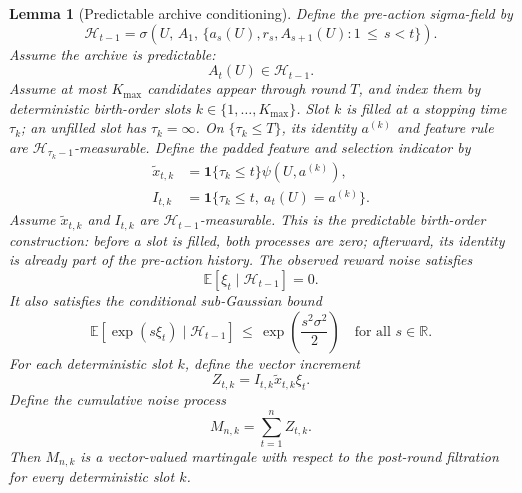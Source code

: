 \documentclass{article} %
\newtheorem{lemma}[theorem]{Lemma}
\begin{document}
\begin{lemma}[Predictable archive conditioning]
\label{lem:3}
Define the pre-action sigma-field by
\begin{equation}
\label{eq:app-filtration-pre}
\mathcal{H}_{t-1}
=
\sigma\!\left(
U,\,
A_1,\,
\{a_s(U),r_s,A_{s+1}(U):1\,\le\, s<t\}
\right).
\end{equation}
Assume the archive is predictable:
\begin{equation}
\label{eq:app-predictable-archive}
A_t(U)\in \mathcal{H}_{t-1}.
\end{equation}
Assume at most \(K_{\max}\) candidates appear through round \(T\), and index
them by deterministic birth-order slots \(k\in\{1,\ldots,K_{\max}\}\).  Slot
\(k\) is filled at a stopping time \(\tau_k\); an unfilled slot has
\(\tau_k=\infty\).  On \(\{\tau_k\le T\}\), its identity \(a^{(k)}\) and feature
rule are \(\mathcal H_{\tau_k-1}\)-measurable.  Define the padded feature and
selection indicator by
\begin{align}
\label{eq:app-feature-definition}
\widetilde x_{t,k}
&=
\mathbf 1\{\tau_k\le t\}\psi(U,a^{(k)}),
\\
\label{eq:app-action-predictable}
I_{t,k}
&=
\mathbf 1\{\tau_k\le t,\ a_t(U)=a^{(k)}\}.
\end{align}
Assume \(\widetilde x_{t,k}\) and \(I_{t,k}\) are
\(\mathcal H_{t-1}\)-measurable.  This is the predictable birth-order
construction: before a slot is filled, both processes are zero; afterward, its
identity is already part of the pre-action history.
The observed reward noise satisfies
\begin{equation}
\label{eq:app-noise-zero-mean}
\mathbb{E}[\xi_t\mid \mathcal{H}_{t-1}]
=
0.
\end{equation}
It also satisfies the conditional sub-Gaussian bound
\begin{equation}
\label{eq:app-noise-subg}
\mathbb{E}\!\left[\exp(s\xi_t)\mid \mathcal{H}_{t-1}\right]
\,\le\,
\exp\!\left(\frac{s^2\sigma^2}{2}\right)
\quad
\text{for all }s\in\mathbb{R}.
\end{equation}
For each deterministic slot \(k\), define the vector increment
\begin{equation}
\label{eq:app-mart-increment}
Z_{t,k}
=
I_{t,k}\widetilde x_{t,k}\xi_t.
\end{equation}
Define the cumulative noise process
\begin{equation}
\label{eq:app-mart-process}
M_{n,k}
=
\sum_{t=1}^{n}Z_{t,k}.
\end{equation}
Then \(M_{n,k}\) is a vector-valued martingale with respect to the post-round
filtration for every deterministic slot \(k\).
\end{lemma}
\end{document}
